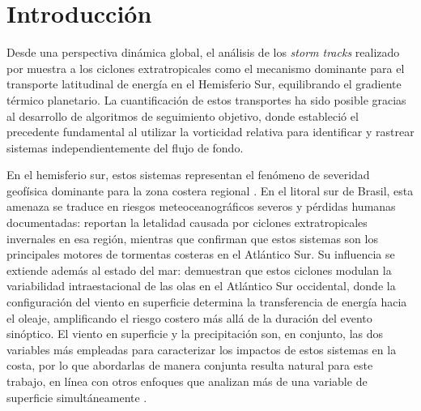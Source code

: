 \chapter{Introducción} \label{ch:introduccion}


Desde una perspectiva dinámica global, el análisis de los \emph{storm tracks} realizado por \citet{hoskins2005new} muestra a los ciclones extratropicales como el mecanismo dominante para el transporte latitudinal de energía en el Hemisferio Sur, equilibrando el gradiente térmico planetario. La cuantificación de estos transportes ha sido posible gracias al desarrollo de algoritmos de seguimiento objetivo, donde \citet{sinclair1994objective} estableció el precedente fundamental al utilizar la vorticidad relativa para identificar y rastrear sistemas independientemente del flujo de fondo.

En el hemisferio sur, estos sistemas representan el fenómeno de severidad geofísica dominante para la zona costera regional \citep{gramcianinov2023impact}. En el litoral sur de Brasil, esta amenaza se traduce en riesgos meteoceanográficos severos y pérdidas humanas documentadas: \citet{bartolomei2024extremos} reportan la letalidad causada por ciclones extratropicales invernales en esa región, mientras que \citet{miranda2026patterns} confirman que estos sistemas son los principales motores de tormentas costeras en el Atlántico Sur. Su influencia se extiende además al estado del mar: \citet{sasaki2021intraseasonal} demuestran que estos ciclones modulan la variabilidad intraestacional de las olas en el Atlántico Sur occidental, donde la configuración del viento en superficie determina la transferencia de energía hacia el oleaje, amplificando el riesgo costero más allá de la duración del evento sinóptico. El viento en superficie y la precipitación son, en conjunto, las dos variables más empleadas para caracterizar los impactos de estos sistemas en la costa, por lo que abordarlas de manera conjunta resulta natural para este trabajo, en línea con otros enfoques que analizan más de una variable de superficie simultáneamente \citep{zscheischler2018future}.

